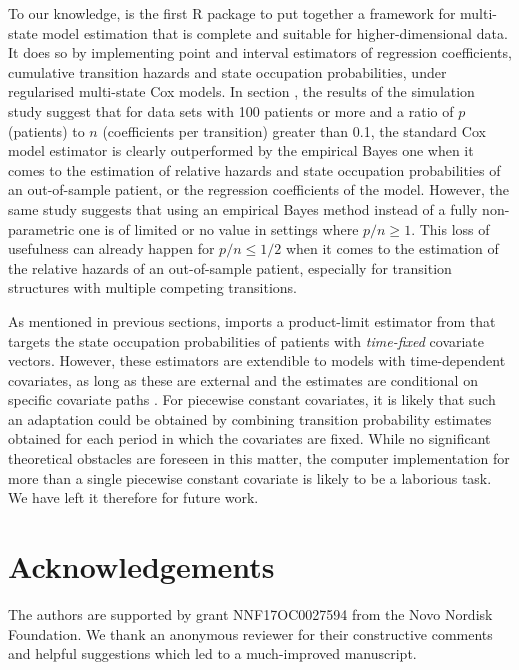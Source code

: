 To our knowledge,  is the first R package to put together a  framework for multi-state model estimation that is complete and suitable for higher-dimensional data. 
 It does so by implementing point and interval estimators of regression coefficients, cumulative transition hazards and state occupation probabilities, under regularised multi-state Cox models.  
 In section , the results of the simulation study suggest that for data sets with 100 patients or more and a ratio of $p$ (patients) to $n$ (coefficients per transition) greater than 0.1, the standard Cox model estimator is clearly outperformed by the empirical Bayes one when it comes to the estimation of relative hazards and state occupation probabilities of an out-of-sample patient, or the regression coefficients of the model. However, the same study suggests that using an empirical Bayes method instead of a fully non-parametric one is of limited or no value in settings where $p/n \geq 1$. This loss of usefulness can already happen for $p/n\leq 1/2$ when it comes to the estimation of the relative hazards of an out-of-sample patient, especially for transition structures with multiple competing transitions.

 As mentioned in previous sections,  imports a product-limit estimator from  that targets the state occupation probabilities of patients with \textit{time-fixed} covariate vectors. However, these estimators are extendible to models with time-dependent covariates, as long as these are external and the estimates are conditional on specific covariate paths \citep[][p. 142]{Aalen2008}. For piecewise constant covariates, it is likely that such an adaptation could be obtained by combining transition probability estimates obtained for each period in which the covariates are fixed. While no significant theoretical obstacles are foreseen in this matter, the computer implementation for more than a single piecewise constant covariate is likely to be a laborious task. We have left it therefore for future work.
 
 \section*{Acknowledgements}
 The authors are supported by grant NNF17OC0027594 from the Novo Nordisk Foundation. We thank an anonymous reviewer for their constructive comments and helpful suggestions which led to a much-improved manuscript.

